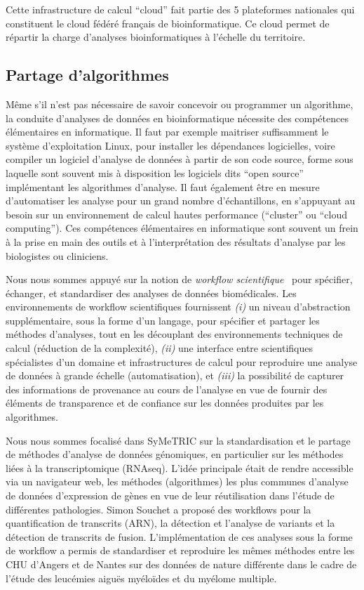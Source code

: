 \documentclass[a4paper,10pt]{article}
\theoremstyle{definition}
\begin{document}
Cette infrastructure de calcul ``cloud'' fait partie des 5 plateformes nationales qui constituent le cloud fédéré français de bioinformatique. Ce cloud permet de répartir la charge d'analyses bioinformatiques à l'échelle du territoire. 

\subsection{Partage d'algorithmes}\label{sec:wp2}
Même s'il n'est pas nécessaire de savoir concevoir ou programmer un algorithme, la conduite d'analyses de données en bioinformatique nécessite des compétences élémentaires en informatique. Il faut par exemple maitriser suffisamment le système d'exploitation Linux, pour installer les dépendances logicielles, voire compiler un logiciel d'analyse de données à partir de son code source, forme sous laquelle sont souvent mis à disposition les logiciels dits ``open source'' implémentant les algorithmes d'analyse. Il faut également être en mesure d'automatiser les analyse pour un grand nombre d'échantillons, en s'appuyant au besoin sur un environnement de calcul hautes performance (``cluster'' ou ``cloud computing''). Ces compétences élémentaires en informatique sont souvent un frein à la prise en main des outils et à l'interprétation des résultats d'analyse par les biologistes ou cliniciens. 

Nous nous sommes appuyé sur la notion de {\em workflow scientifique}~\cite{fgcs-workflows-17} pour spécifier, échanger, et standardiser des analyses de données biomédicales. Les environnements de workflow scientifiques fournissent {\em (i)} un niveau d'abstraction sup\-plé\-men\-taire, sous la forme d'un langage, pour spécifier et partager les méthodes d'analyses, tout en les découplant des environnements techniques de calcul (réduction de la complexité), {\em (ii)} une interface entre scientifiques spécialistes d'un domaine et infrastructures de calcul pour reproduire une analyse de données à grande échelle (automatisation), et {\em (iii)} la possibilité de capturer des informations de provenance au cours de l'analyse en vue de fournir des éléments de transparence et de confiance sur les données produites par les algorithmes. 

Nous nous sommes focalisé dans SyMeTRIC sur la standardisation et le partage de méthodes d'analyse de données génomiques, en particulier sur les méthodes liées à la transcriptomique (RNAseq). L'idée principale était de rendre accessible via un navigateur web, les méthodes (algorithmes) les plus communes d’analyse de données d’expression de gènes en vue de leur réutilisation dans l'étude de différentes pathologies. Simon Souchet a proposé des workflows pour la quantification de transcrits (ARN), la détection et l'analyse de variants et la détection de transcrits de fusion. L'implémentation de ces analyses sous la forme de workflow a permis de standardiser et reproduire les mêmes méthodes entre les CHU d'Angers et de Nantes sur des données de nature différente dans le cadre de l'étude des leucémies aiguës myéloïdes et du myélome multiple.  
\end{document}

